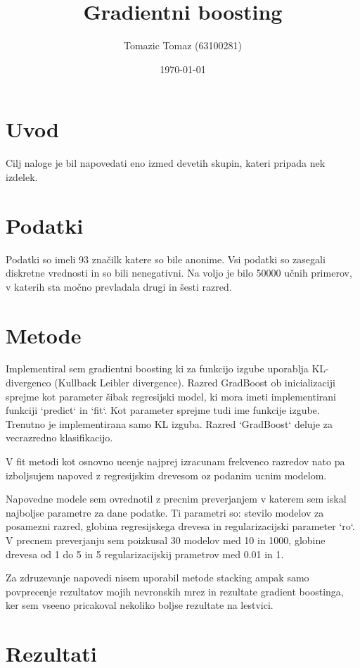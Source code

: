 \documentclass[a4paper,11pt]{article}
\title{Gradientni boosting}
\author{Tomazic Tomaz (63100281)}
\date{\today}
\begin{document}
\maketitle

\section{Uvod}

Cilj naloge je bil napovedati eno izmed devetih skupin, kateri pripada nek izdelek.

\section{Podatki}

Podatki so imeli 93 značilk katere so bile anonime. Vsi podatki so zasegali diskretne vrednosti in so bili nenegativni.
Na voljo je bilo 50000 učnih primerov, v katerih sta močno prevladala drugi in šesti razred.

\section{Metode}

Implementiral sem gradientni boosting ki za funkcijo izgube uporablja KL-divergenco (Kullback Leibler divergence). Razred GradBoost ob inicializaciji sprejme kot parameter šibak regresijski model, ki mora imeti implementirani funkciji `predict` in `fit`. Kot parameter sprejme tudi ime funkcije izgube. Trenutno je implementirana samo KL izguba. Razred `GradBoost` deluje za vecrazredno klasifikacijo.

V fit metodi kot osnovno ucenje najprej izracunam frekvenco razredov nato pa izboljsujem napoved z regresijskim drevesom oz podanim ucnim modelom.

Napovedne modele sem ovrednotil z precnim preverjanjem v katerem sem iskal najboljse parametre za dane podatke. Ti parametri so: stevilo modelov za posamezni razred, globina regresijskega drevesa in regularizacijski parameter `ro`. V precnem preverjanju sem poizkusal 30 modelov med 10 in 1000, globine drevesa od 1 do 5 in 5 regularizacijskij prametrov med 0.01 in 1.

Za zdruzevanje napovedi nisem uporabil metode stacking ampak samo povprecenje rezultatov mojih nevronskih mrez in rezultate gradient boostinga, ker sem vseeno pricakoval nekoliko boljse rezultate na lestvici.

\section{Rezultati}
\end{document}
